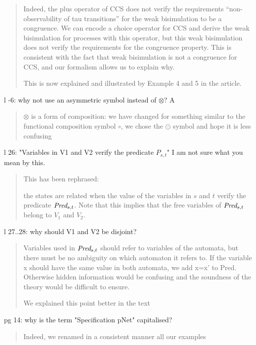 \documentclass{article}
\begin{document}
\begin{quote}
Indeed, the plus operator of CCS does not verify the requirements ``non-observability of tau transitions'' for the weak bisimulation to be a congruence. 
We can encode a choice operator for CCS and derive the weak bisimulation for processes with this operator, 
but this weak bisimulation does not verify the requirements for the congruence property. This is consistent with the fact that weak bisimulation is not a congruence for CCS, and our formalism allows us to explain why.

This is now explained and illustrated by Example 4 and 5 in the article.
\end{quote}

l -6: why not use an asymmetric symbol instead of $\otimes$? 
A%
\begin{quote}
$\otimes$ is a form of composition: we have changed for something similar to the functional composition symbol $\circ$, we chose the $\odot$ symbol and hope it is less confusing
\end{quote}

l 26: "Variables in V1 and V2 verify the predicate $P_{s,t}$" I am not sure what you mean by this.
\begin{quote}
This has been rephrased:

the states are related when the value of the variables in $s$ and $t$  verify the predicate $\Pred_{s,t}$. Note that this implies that the free variables of  $\Pred_{s,t}$ belong to $V_1$ and $V_2$.

\end{quote}

l 27..28: why should V1 and V2 be disjoint?
\begin{quote}
Variables used in $\Pred_{s,t}$ should refer to variables of the automata, but there must be no ambiguity on which automaton it refers to. If the variable x should have the same value in both automata, we add x=x' to Pred. Otherwise hidden information would be confusing and the soundness of the theory would be difficult to ensure.

We explained this point better in the text
\end{quote}

pg 14:  why is the term "Specification pNet" capitalised?
\begin{quote}
Indeed, we renamed in a consistent manner all our examples
\end{quote}
\end{document}

